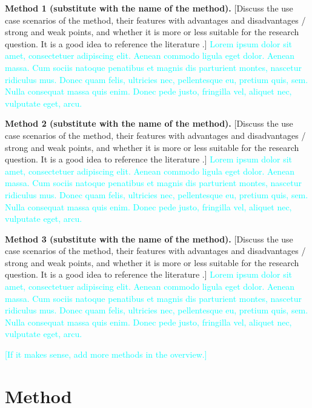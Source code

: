 \documentclass[%
 reprint,
 amsmath,amssymb,
 aps,
]{revtex4-2}
\begin{document}
{\bf Method 1 (substitute with the name of the method).} {[Discuss the use case scenarios of the method, their features with advantages and disadvantages / strong and weak points, and whether it is more or less suitable for the research question. It is a good idea to reference the literature \cite{prenom2017find, surname1999peer}.]} 
\textcolor{cyan}{Lorem ipsum dolor sit amet, consectetuer adipiscing elit. Aenean commodo ligula eget dolor. Aenean massa. Cum sociis natoque penatibus et magnis dis parturient montes, nascetur ridiculus mus. Donec quam felis, ultricies nec, pellentesque eu, pretium quis, sem. Nulla consequat massa quis enim. Donec pede justo, fringilla vel, aliquet nec, vulputate eget, arcu. }

{\bf Method 2 (substitute with the name of the method).} {[Discuss the use case scenarios of the method, their features with advantages and disadvantages / strong and weak points, and whether it is more or less suitable for the research question. It is a good idea to reference the literature \cite{prenom2017find, surname1999peer}.]} 
\textcolor{cyan}{Lorem ipsum dolor sit amet, consectetuer adipiscing elit. Aenean commodo ligula eget dolor. Aenean massa. Cum sociis natoque penatibus et magnis dis parturient montes, nascetur ridiculus mus. Donec quam felis, ultricies nec, pellentesque eu, pretium quis, sem. Nulla consequat massa quis enim. Donec pede justo, fringilla vel, aliquet nec, vulputate eget, arcu. }

{\bf Method 3 (substitute with the name of the method).} {[Discuss the use case scenarios of the method, their features with advantages and disadvantages / strong and weak points, and whether it is more or less suitable for the research question. It is a good idea to reference the literature \cite{prenom2017find, surname1999peer}.]} 
\textcolor{cyan}{Lorem ipsum dolor sit amet, consectetuer adipiscing elit. Aenean commodo ligula eget dolor. Aenean massa. Cum sociis natoque penatibus et magnis dis parturient montes, nascetur ridiculus mus. Donec quam felis, ultricies nec, pellentesque eu, pretium quis, sem. Nulla consequat massa quis enim. Donec pede justo, fringilla vel, aliquet nec, vulputate eget, arcu. }

\textcolor{cyan}{[If it makes sense, add more methods in the overview.]} 
\textcolor{cyan}{\lipsum[7]}




\section{\label{sec:method}Method} %
\end{document}
